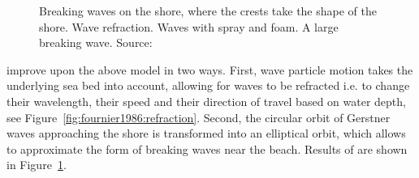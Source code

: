 \begin{figure}
{	\label{fig:fournier1986:results:3}
 }
 \hfill
 \caption{
  Breaking waves on the shore, where the crests take the shape of the shore.
  Wave refraction.
  Waves with spray and foam.
  A large breaking wave.
 Source:~\cite{Fournier:1986}
 }
 \label{fig:fournier1986:results}
\end{figure}
%
\citeauthor{Fournier:1986} improve upon the above model in two ways. First, wave
particle motion takes the underlying sea bed into account, allowing for waves
to be refracted i.e. to change their wavelength, their speed and their direction
of travel based on water depth, see Figure~\ref{fig:fournier1986:refraction}.
Second, the circular orbit of Gerstner waves approaching the shore is
transformed into an elliptical orbit, which allows to approximate the form of
breaking waves near the beach. Results of \cite{Fournier:1986} are shown in
Figure~\ref{fig:fournier1986:results}.
%
